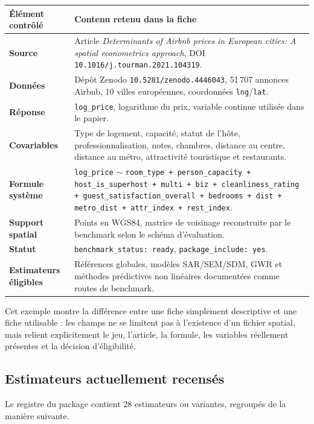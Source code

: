 \documentclass[11pt,a4paper]{article}
\begin{document}
\begin{center}
\small
\begin{tabularx}{\textwidth}{>{\bfseries}p{3.8cm}X}
\toprule
Élément contrôlé & Contenu retenu dans la fiche \\
\midrule
Source & Article \emph{Determinants of Airbnb prices in European cities: A spatial econometrics approach}, DOI \texttt{10.1016/j.tourman.2021.104319}. \\
Données & Dépôt Zenodo \texttt{10.5281/zenodo.4446043}, 51\,707 annonces Airbnb, 10 villes européennes, coordonnées \texttt{lng}/\texttt{lat}. \\
Réponse & \texttt{log\_price}, logarithme du prix, variable continue utilisée dans le papier. \\
Covariables & Type de logement, capacité, statut de l'hôte, professionnalisation, notes, chambres, distance au centre, distance au métro, attractivité touristique et restaurants. \\
Formule système & \texttt{log\_price} $\sim$ \texttt{room\_type + person\_capacity + host\_is\_superhost + multi + biz + cleanliness\_rating + guest\_satisfaction\_overall + bedrooms + dist + metro\_dist + attr\_index + rest\_index}. \\
Support spatial & Points en WGS84, matrice de voisinage reconstruite par le benchmark selon le schéma d'évaluation. \\
Statut & \texttt{benchmark\_status: ready}, \texttt{package\_include: yes}. \\
Estimateurs éligibles & Références globales, modèles SAR/SEM/SDM, GWR et méthodes prédictives non linéaires documentées comme routes de benchmark. \\
\bottomrule
\end{tabularx}
\end{center}

Cet exemple montre la différence entre une fiche simplement descriptive et une fiche utilisable : les champs ne se limitent pas à l'existence d'un fichier spatial, mais relient explicitement le jeu, l'article, la formule, les variables réellement présentes et la décision d'éligibilité.

\subsection{Estimateurs actuellement recensés}

Le registre du package contient 28 estimateurs ou variantes, regroupés de la manière suivante.
\end{document}
